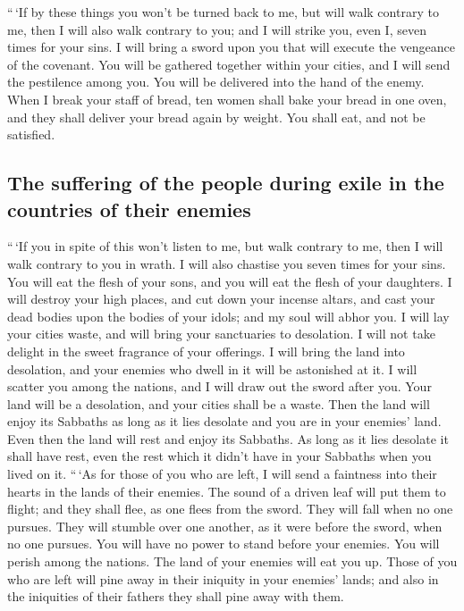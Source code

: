  ``\,`If by these things you won't be turned back to me,
but will walk contrary to me,  then I will also walk
contrary to you; and I will strike you, even I, seven times for your
sins.  I will bring a sword upon you that will execute
the vengeance of the covenant. You will be gathered together within your
cities, and I will send the pestilence among you. You will be delivered
into the hand of the enemy.  When I break your staff of
bread, ten women shall bake your bread in one oven, and they shall
deliver your bread again by weight. You shall eat, and not be satisfied.

\hypertarget{the-suffering-of-the-people-during-exile-in-the-countries-of-their-enemies}{%
\subsection{The suffering of the people during exile in the countries of
their
enemies}\label{the-suffering-of-the-people-during-exile-in-the-countries-of-their-enemies}}

 ``\,`If you in spite of this won't listen to me, but
walk contrary to me,  then I will walk contrary to you in
wrath. I will also chastise you seven times for your sins.
 You will eat the flesh of your sons, and you will eat
the flesh of your daughters.  I will destroy your high
places, and cut down your incense altars, and cast your dead bodies upon
the bodies of your idols; and my soul will abhor you.  I
will lay your cities waste, and will bring your sanctuaries to
desolation. I will not take delight in the sweet fragrance of your
offerings.  I will bring the land into desolation, and
your enemies who dwell in it will be astonished at it.  I
will scatter you among the nations, and I will draw out the sword after
you. Your land will be a desolation, and your cities shall be a waste.
 Then the land will enjoy its Sabbaths as long as it lies
desolate and you are in your enemies' land. Even then the land will rest
and enjoy its Sabbaths.  As long as it lies desolate it
shall have rest, even the rest which it didn't have in your Sabbaths
when you lived on it.  ``\,`As for those of you who are
left, I will send a faintness into their hearts in the lands of their
enemies. The sound of a driven leaf will put them to flight; and they
shall flee, as one flees from the sword. They will fall when no one
pursues.  They will stumble over one another, as it were
before the sword, when no one pursues. You will have no power to stand
before your enemies.  You will perish among the nations.
The land of your enemies will eat you up.  Those of you
who are left will pine away in their iniquity in your enemies' lands;
and also in the iniquities of their fathers they shall pine away with
them.

